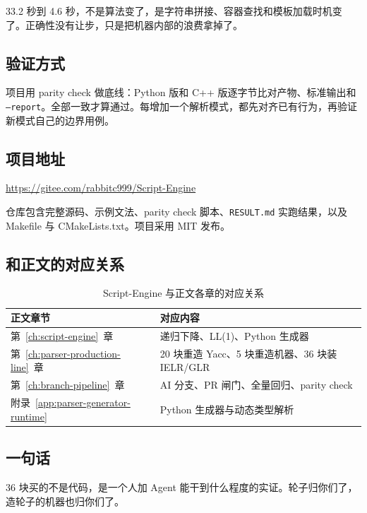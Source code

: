33.2 秒到 4.6 秒，不是算法变了，是字符串拼接、容器查找和模板加载时机变了。正确性没有让步，只是把机器内部的浪费拿掉了。

\subsection{验证方式}

项目用 parity check 做底线：Python 版和 C++ 版逐字节比对产物、标准输出和 \texttt{--report}。全部一致才算通过。每增加一个解析模式，都先对齐已有行为，再验证新模式自己的边界用例。

\subsection{项目地址}

\url{https://gitee.com/rabbitc999/Script-Engine}

仓库包含完整源码、示例文法、parity check 脚本、\texttt{RESULT.md} 实跑结果，以及 Makefile 与 CMakeLists.txt。项目采用 MIT 发布。

\subsection{和正文的对应关系}

\begin{table}[htbp]
	\centering
	\caption{Script-Engine 与正文各章的对应关系}
	\label{tab:app-parsergen-mapping}
	\begin{tabular}{ll}
		\toprule
		正文章节 & 对应内容 \\
		\midrule
		第~\ref{ch:script-engine}~章 & 递归下降、LL(1)、Python 生成器 \\
		第~\ref{ch:parser-production-line}~章 & 20 块重造 Yacc、5 块重造机器、36 块装 IELR/GLR \\
		第~\ref{ch:branch-pipeline}~章 & AI 分支、PR 闸门、全量回归、parity check \\
		附录~\ref{app:parser-generator-runtime} & Python 生成器与动态类型解析 \\
		\bottomrule
	\end{tabular}
\end{table}

\subsection{一句话}

36 块买的不是代码，是一个人加 Agent 能干到什么程度的实证。轮子归你们了，造轮子的机器也归你们了。
